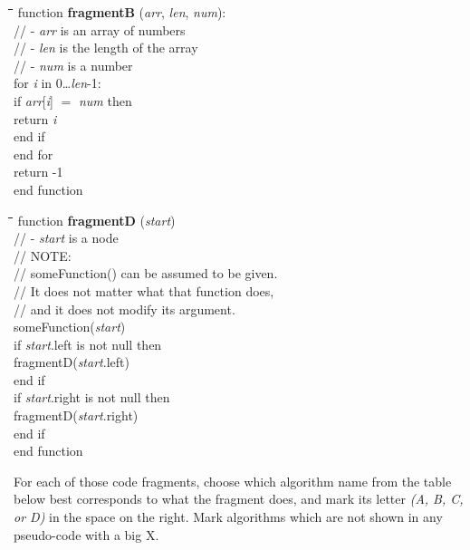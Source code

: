 \documentclass[a4paper]{article}
\begin{document}
\hfill%
\begin{minipage}[t]{0.44\columnwidth}
  
  \begin{tabbing}
    \quad\=\quad\=\quad\=\quad\=\quad\=\kill
    function \textbf{fragmentB} (\emph{arr}, \emph{len}, \emph{num}):\\
    \>// - \emph{arr} is an array of numbers\\
    \>// - \emph{len} is the length of the array\\
    \>// - \emph{num} is a number\\
    \>for \emph{i} in 0\ldots\emph{len}-1:\\
    \>\>if \emph{arr}[\emph{i}] $=$ \emph{num} then\\
    \>\>\>return \emph{i}\\
    \>\>end if\\
    \>end for\\
    \>return -1\\
    end function
  \end{tabbing}
  
  \begin{tabbing}
    \quad\=\quad\=\quad\=\quad\=\quad\=\kill
    function \textbf{fragmentD} (\emph{start})\\
    \>// - \emph{start} is a node\\
    \>// NOTE:\\
    \>// \quad someFunction() can be assumed to be given.\\
    \>// \quad It does not matter what that function does,\\
    \>// \quad and it does not modify its argument.\\
    \>someFunction(\emph{start})\\
    \>if \emph{start}.left is not null then\\
    \>\>fragmentD(\emph{start}.left)\\
    \>end if\\
    \>if \emph{start}.right is not null then\\
    \>\>fragmentD(\emph{start}.right)\\
    \>end if\\
    end function
  \end{tabbing}
\end{minipage}
\normalsize
\vspace{\baselineskip}

For each of those code fragments, choose which algorithm name from the table below best corresponds to what the fragment does, and mark its letter \emph{(A, B, C, or D)} in the space on the right.
Mark algorithms which are not shown in any pseudo-code with a big X.
\end{document}
